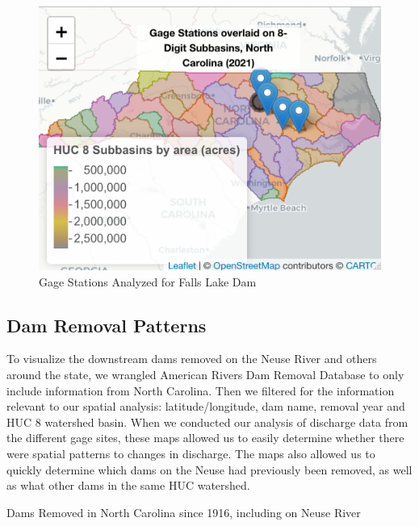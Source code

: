 \documentclass[
  12pt,
]{article}
\begin{document}
\begin{figure}
\centering
\includegraphics{"./Output/gage.station.png"}
\caption{Gage Stations Analyzed for Falls Lake Dam}
\end{figure}

\hypertarget{dam-removal-patterns}{%
\subsection{Dam Removal Patterns}\label{dam-removal-patterns}}

To visualize the downstream dams removed on the Neuse River and others
around the state, we wrangled American Rivers Dam Removal Database to
only include information from North Carolina. Then we filtered for the
information relevant to our spatial analysis: latitude/longitude, dam
name, removal year and HUC 8 watershed basin. When we conducted our
analysis of discharge data from the different gage sites, these maps
allowed us to easily determine whether there were spatial patterns to
changes in discharge. The maps also allowed us to quickly determine
which dams on the Neuse had previously been removed, as well as what
other dams in the same HUC watershed.

Dams Removed in North Carolina since 1916, including on Neuse River
\end{document}
